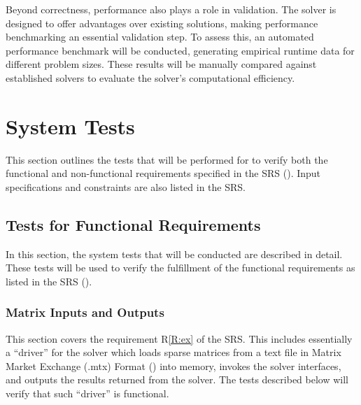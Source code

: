 \documentclass[12pt, titlepage]{article}
\newcommand{\rref}[1]{R\ref{#1}}
\begin{document}
Beyond correctness, performance also plays a role in validation. The solver is
designed to offer advantages over existing solutions, making performance
benchmarking an essential validation step. To assess this, an automated
performance benchmark will be conducted, generating empirical runtime data for
different problem sizes. These results will be manually compared against
established solvers to evaluate the solver’s computational efficiency.

\section{System Tests}
\label{sec:system-tests}

This section outlines the tests that will be performed for \progname{} to verify
both the functional and non-functional requirements specified in the SRS
(\cite{SRS}). Input specifications and constraints are also listed in the SRS.

\subsection{Tests for Functional Requirements}



In this section, the system tests that will be conducted are described in
detail. These tests will be used to verify the fulfillment of the functional
requirements as listed in the SRS (\cite{SRS}).

\subsubsection{Matrix Inputs and Outputs}

This section covers the requirement \rref{R:ex} of the SRS. This includes
essentially a ``driver'' for the solver which loads sparse matrices from a text
file in Matrix Market Exchange (.mtx) Format (\cite{noauthor_matrix_2013}) into memory,
invokes the solver interfaces, and outputs the results returned from the solver.
The tests described below will verify that such ``driver'' is functional.
\end{document}
